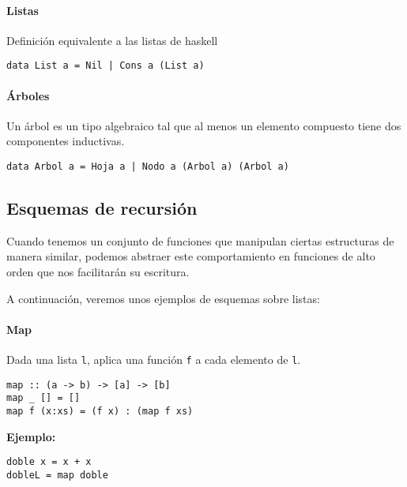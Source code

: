 \documentclass[10pt,a4paper]{article}
\begin{document}
\paragraph{Listas} Definición equivalente a las listas de haskell
\begin{centrado}
	\begin{verbatim}
data List a = Nil | Cons a (List a)
	\end{verbatim}
\end{centrado}

\paragraph{Árboles}
Un árbol es un tipo algebraico tal que al menos un elemento compuesto tiene dos componentes inductivas.

\begin{centrado}
	\begin{verbatim}
data Arbol a = Hoja a | Nodo a (Arbol a) (Arbol a)
	\end{verbatim}
\end{centrado}

\subsection{Esquemas de recursión} \label{sec:funcional.sub:esquemas_recursion}
Cuando tenemos un conjunto de funciones que manipulan ciertas estructuras de manera similar, podemos abstraer este comportamiento en funciones de alto orden que nos facilitarán su escritura.

A continuación, veremos unos ejemplos de esquemas sobre listas: 
\paragraph{Map}
Dada una lista \texttt{l}, aplica una función \texttt{f} a cada elemento de \texttt{l}.
\begin{centrado}
	\begin{verbatim}
map :: (a -> b) -> [a] -> [b]
map _ [] = []
map f (x:xs) = (f x) : (map f xs)
	\end{verbatim}
\end{centrado} 

\textbf{Ejemplo:}
\begin{centrado}
	\begin{verbatim}
doble x = x + x
dobleL = map doble  
	\end{verbatim}
\end{centrado} 
\end{document}

